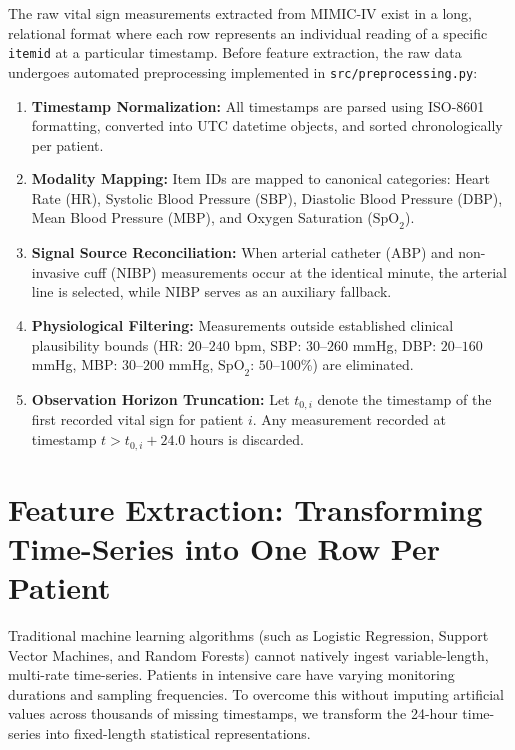 The raw vital sign measurements extracted from MIMIC-IV exist in a long, relational format where each row represents an individual reading of a specific \texttt{itemid} at a particular timestamp. Before feature extraction, the raw data undergoes automated preprocessing implemented in \texttt{src/preprocessing.py}:

\begin{enumerate}
    \item \textbf{Timestamp Normalization:} All timestamps are parsed using ISO-8601 formatting, converted into UTC datetime objects, and sorted chronologically per patient.
    \item \textbf{Modality Mapping:} Item IDs are mapped to canonical categories: Heart Rate (HR), Systolic Blood Pressure (SBP), Diastolic Blood Pressure (DBP), Mean Blood Pressure (MBP), and Oxygen Saturation ($\text{SpO}_2$).
    \item \textbf{Signal Source Reconciliation:} When arterial catheter (ABP) and non-invasive cuff (NIBP) measurements occur at the identical minute, the arterial line is selected, while NIBP serves as an auxiliary fallback.
    \item \textbf{Physiological Filtering:} Measurements outside established clinical plausibility bounds (HR: $20$--$240$ bpm, SBP: $30$--$260$ mmHg, DBP: $20$--$160$ mmHg, MBP: $30$--$200$ mmHg, $\text{SpO}_2$: $50$--$100$\%) are eliminated.
    \item \textbf{Observation Horizon Truncation:} Let $t_{0, i}$ denote the timestamp of the first recorded vital sign for patient $i$. Any measurement recorded at timestamp $t > t_{0, i} + 24.0\text{ hours}$ is discarded.
\end{enumerate}

\section{Feature Extraction: Transforming Time-Series into One Row Per Patient}
\label{sec:feature_engineering}

Traditional machine learning algorithms (such as Logistic Regression, Support Vector Machines, and Random Forests) cannot natively ingest variable-length, multi-rate time-series. Patients in intensive care have varying monitoring durations and sampling frequencies. To overcome this without imputing artificial values across thousands of missing timestamps, we transform the 24-hour time-series into fixed-length statistical representations.

